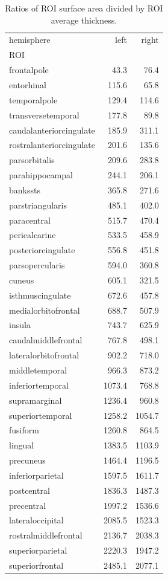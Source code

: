 \documentclass{article}
\begin{document}
\begin{table}[H]
\centering
\caption{Ratios of ROI surface area divided by ROI average thickness.}\label{tab:sa-ratios}
\begin{tabular}{lrr}
\toprule
hemisphere & left & right \\
ROI &  &  \\
\midrule
frontalpole & 43.3 & 76.4 \\
entorhinal & 115.6 & 65.8 \\
temporalpole & 129.4 & 114.6 \\
transversetemporal & 177.8 & 89.8 \\
caudalanteriorcingulate & 185.9 & 311.1 \\
rostralanteriorcingulate & 201.6 & 135.6 \\
parsorbitalis & 209.6 & 283.8 \\
parahippocampal & 244.1 & 206.1 \\
bankssts & 365.8 & 271.6 \\
parstriangularis & 485.1 & 402.0 \\
paracentral & 515.7 & 470.4 \\
pericalcarine & 533.5 & 458.9 \\
posteriorcingulate & 556.8 & 451.8 \\
parsopercularis & 594.0 & 360.8 \\
cuneus & 605.1 & 321.5 \\
isthmuscingulate & 672.6 & 457.8 \\
medialorbitofrontal & 688.7 & 507.9 \\
insula & 743.7 & 625.9 \\
caudalmiddlefrontal & 767.8 & 498.1 \\
lateralorbitofrontal & 902.2 & 718.0 \\
middletemporal & 966.3 & 873.2 \\
inferiortemporal & 1073.4 & 768.8 \\
supramarginal & 1236.4 & 960.8 \\
superiortemporal & 1258.2 & 1054.7 \\
fusiform & 1260.8 & 864.5 \\
lingual & 1383.5 & 1103.9 \\
precuneus & 1464.4 & 1196.5 \\
inferiorparietal & 1597.5 & 1611.7 \\
postcentral & 1836.3 & 1487.3 \\
precentral & 1997.2 & 1536.6 \\
lateraloccipital & 2085.5 & 1523.3 \\
rostralmiddlefrontal & 2136.7 & 2038.3 \\
superiorparietal & 2220.3 & 1947.2 \\
superiorfrontal & 2485.1 & 2077.1 \\
\bottomrule
\end{tabular}
\end{table}
\end{document}
